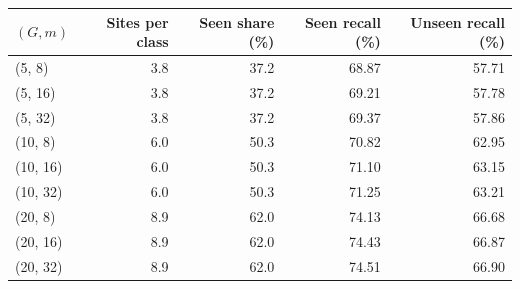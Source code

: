 \begin{tabular}{@{}lrrrr@{}}
\toprule
$(G, m)$ & Sites per class & Seen share (\%) & Seen recall (\%) & Unseen recall (\%) \\
\midrule
(5, 8) & 3.8 & 37.2 & 68.87 & 57.71 \\
(5, 16) & 3.8 & 37.2 & 69.21 & 57.78 \\
(5, 32) & 3.8 & 37.2 & 69.37 & 57.86 \\
(10, 8) & 6.0 & 50.3 & 70.82 & 62.95 \\
(10, 16) & 6.0 & 50.3 & 71.10 & 63.15 \\
(10, 32) & 6.0 & 50.3 & 71.25 & 63.21 \\
(20, 8) & 8.9 & 62.0 & 74.13 & 66.68 \\
(20, 16) & 8.9 & 62.0 & 74.43 & 66.87 \\
(20, 32) & 8.9 & 62.0 & 74.51 & 66.90 \\
\bottomrule
\end{tabular}
